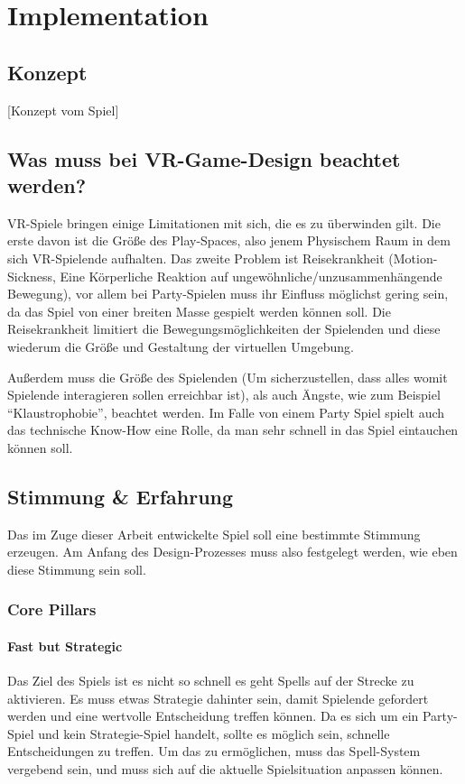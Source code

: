 \chapter{Implementation}

\section{Konzept}

[Konzept vom Spiel]

\section{Was muss bei VR-Game-Design beachtet werden?}

VR-Spiele bringen einige Limitationen mit sich, die es zu überwinden gilt. Die erste davon ist die Größe des Play-Spaces, also jenem Physischem Raum in dem sich VR-Spielende aufhalten. Das zweite Problem ist Reisekrankheit (Motion-Sickness, Eine Körperliche Reaktion auf ungewöhnliche/unzusammenhängende Bewegung\cite[S. 533]{_art_of_gamedesign}), vor allem bei Party-Spielen muss ihr Einfluss möglichst gering sein, da das Spiel von einer breiten Masse gespielt werden können soll. Die Reisekrankheit limitiert die Bewegungsmöglichkeiten der Spielenden und diese wiederum die Größe und Gestaltung der virtuellen Umgebung.

Außerdem muss die Größe des Spielenden (Um sicherzustellen, dass alles womit Spielende interagieren sollen erreichbar ist), als auch Ängste, wie zum Beispiel "`Klaustrophobie"', beachtet werden. Im Falle von einem Party Spiel spielt auch das technische Know-How eine Rolle, da man sehr schnell in das Spiel eintauchen können soll.

\section{Stimmung \& Erfahrung}

Das im Zuge dieser Arbeit entwickelte Spiel soll eine bestimmte Stimmung erzeugen. Am Anfang des Design-Prozesses muss also festgelegt werden, wie eben diese Stimmung sein soll.

\subsection{Core Pillars}

\subsubsection{Fast but Strategic}
Das Ziel des Spiels ist es nicht so schnell es geht Spells auf der Strecke zu aktivieren. Es muss etwas Strategie dahinter sein, damit Spielende gefordert werden und eine wertvolle Entscheidung treffen können. Da es sich um ein Party-Spiel und kein Strategie-Spiel handelt, sollte es möglich sein, schnelle Entscheidungen zu treffen. Um das zu ermöglichen, muss das Spell-System vergebend sein, und muss sich auf die aktuelle Spielsituation anpassen können. 

